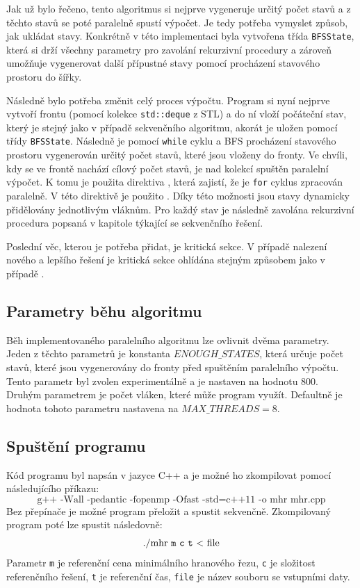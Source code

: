 \documentclass{article}
\begin{document}
Jak už bylo řečeno, tento algoritmus si nejprve vygeneruje určitý počet stavů a z těchto stavů se poté paralelně spustí výpočet. Je tedy potřeba vymyslet způsob, jak ukládat stavy. Konkrétně v této implementaci byla vytvořena třída \texttt{BFSState}, která si drží všechny parametry pro zavolání rekurzivní procedury a zároveň umožňuje vygenerovat další přípustné stavy pomocí procházení stavového prostoru do šířky.  

Následně bylo potřeba změnit celý proces výpočtu. Program si nyní nejprve vytvoří frontu (pomocí kolekce \texttt{std::deque} z STL) a do ní vloží počáteční stav, který je stejný jako v případě sekvenčního algoritmu, akorát je uložen pomocí třídy \texttt{BFSState}. Následně je pomocí \texttt{while} cyklu a BFS procházení stavového prostoru vygenerován určitý počet stavů, které jsou vloženy do fronty. Ve chvíli, kdy se ve frontě nachází cílový počet stavů, je nad kolekcí spuštěn paralelní výpočet. K tomu je použita direktiva , která zajistí, že je \texttt{for} cyklus zpracován paralelně. V této direktivě je použito . Díky této možnosti jsou stavy dynamicky přidělovány jednotlivým vláknům. Pro každý stav je následně zavolána rekurzivní procedura popsaná v kapitole týkající se sekvenčního řešení.

Poslední věc, kterou je potřeba přidat, je kritická sekce. V případě nalezení nového a lepšího řešení je kritická sekce ohlídána stejným způsobem jako v případě .

\subsection{Parametry běhu algoritmu}
Běh implementovaného paralelního algoritmu lze ovlivnit dvěma parametry. Jeden z těchto parametrů je konstanta $ENOUGH\_STATES$, která určuje počet stavů, které jsou vygenerovány do fronty před spuštěním paralelního výpočtu. Tento parametr byl zvolen experimentálně a je nastaven na hodnotu 800. Druhým parametrem je počet vláken, které může program využít. Defaultně je hodnota tohoto parametru nastavena na $MAX\_THREADS = 8$.

\subsection{Spuštění programu}
Kód programu byl napsán v jazyce C++ a je možné ho zkompilovat pomocí následujícího příkazu: $$\text{g++ -Wall -pedantic -fopenmp -Ofast -std=c++11 -o mhr mhr.cpp}$$ 
Bez přepínače  je možné program přeložit a spustit sekvenčně. Zkompilovaný program poté lze spustit následovně:
$$\text{./mhr \texttt{m} \texttt{c} \texttt{t} \textless \ file}$$
Parametr \texttt{m} je referenční cena minimálního hranového řezu, \texttt{c} je složitost referenčního řešení, \texttt{t} je referenční čas, \texttt{file} je název souboru se vstupními daty. 
\end{document}
